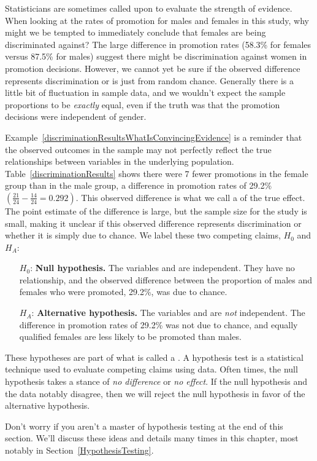 \begin{example}{Statisticians are sometimes called upon to evaluate the strength of evidence. When looking at the rates of promotion for males and females in this study, why might we be tempted to immediately conclude that females are being discriminated against?}\label{discriminationResultsWhatIsConvincingEvidence}
The large difference in promotion rates (58.3\% for females versus 87.5\% for males) suggest there might be discrimination against women in promotion decisions. However, we cannot yet be sure if the observed difference represents discrimination or is just from random chance. Generally there is a little bit of fluctuation in sample data, and we wouldn't expect the sample proportions to be \emph{exactly} equal, even if the truth was that the promotion decisions were independent of gender.
\end{example}

Example~\ref{discriminationResultsWhatIsConvincingEvidence} is a reminder that the observed outcomes in the sample may not perfectly reflect the true relationships between variables in the underlying population. Table~\ref{discriminationResults} shows there were 7 fewer promotions in the female group than in the male group, a difference in promotion rates of 29.2\% $\left( \frac{21}{24} - \frac{14}{24} = 0.292 \right)$. This observed difference is what we call a  of the true effect. The point estimate of the difference is large, but the sample size for the study is small, making it unclear if this observed difference represents discrimination or whether it is simply due to chance. We label these two competing claims, $H_0$ and $H_A$:
\begin{itemize}
\setlength{\itemsep}{0mm}
\item[$H_0$:] \textbf{Null hypothesis.} The variables  and  are independent. They have no relationship, and the observed difference between the proportion of males and females who were promoted, 29.2\%, was due to chance.
\item[$H_A$:] \textbf{Alternative hypothesis.} The variables  and  are \emph{not} independent. The difference in promotion rates of 29.2\% was not due to chance, and equally qualified females are less likely to be promoted than males.
\end{itemize}

\begin{termBox}{
These hypotheses are part of what is called a . A hypothesis test is a statistical technique used to evaluate competing claims using data. Often times, the null hypothesis takes a stance of \emph{no difference} or \emph{no effect}. If the null hypothesis and the data notably disagree, then we will reject the null hypothesis in favor of the alternative hypothesis. \vspace{3mm}

Don't worry if you aren't a master of hypothesis testing at the end of this section. We'll discuss these ideas and details many times in this chapter, most notably in Section~\ref{HypothesisTesting}.}
\end{termBox}

